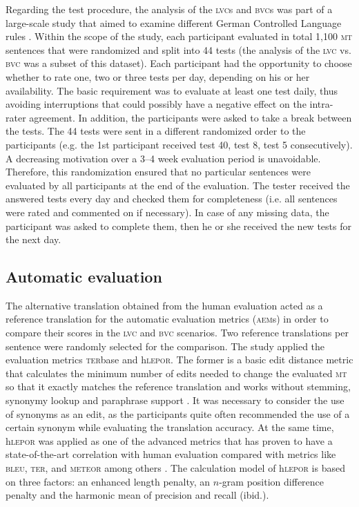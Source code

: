 \documentclass[output=paper]{langsci/langscibook}
\begin{document}
Regarding the test procedure, the analysis of the \textsc{lvc}s and \textsc{bvc}s was part of a large-scale study that aimed to examine different German Controlled Language rules \citep{Marzouk2019}. Within the scope of the study, each participant evaluated in total 1,100 \textsc{mt} sentences that were randomized and split into 44 tests (the analysis of the \textsc{lvc} vs. \textsc{bvc} was a subset of this dataset). Each participant had the opportunity to choose whether to rate one, two or three tests per day, depending on his or her availability. The basic requirement was to evaluate at least one test daily, thus avoiding interruptions that could possibly have a negative effect on the intra-rater agreement. In addition, the participants were asked to take a break between the tests. The 44 tests were sent in a different randomized order to the participants (e.g. the 1st participant received test 40, test 8, test 5 consecutively). A decreasing motivation over a 3--4 week evaluation period is unavoidable. Therefore, this randomization ensured that no particular sentences were evaluated by all participants at the end of the evaluation. The tester received the answered tests every day and checked them for completeness (i.e. all sentences were rated and commented on if necessary). In case of any missing data, the participant was asked to complete them, then he or she received the new tests for the next day.

\subsection{Automatic evaluation}\largerpage


The alternative translation obtained from the human evaluation acted as a reference translation for the automatic evaluation metrics (\textsc{aem}s) in order to compare their scores in the \textsc{lvc} and \textsc{bvc} scenarios. Two reference translations per sentence were randomly selected for the comparison. The study applied the evaluation metrics \textsc{ter}base and h\textsc{lepor}. The former is a basic edit distance metric that calculates the minimum number of edits needed to change the evaluated \textsc{mt} so that it exactly matches the reference translation and works without stemming, synonymy lookup and paraphrase support \citep{Snover2006,Gonzalez2014}. It was necessary to consider the use of synonyms as an edit, as the participants quite often recommended the use of a certain synonym while evaluating the translation accuracy. At the same time, h\textsc{lepor} was applied as one of the advanced metrics that has proven to have a state-of-the-art correlation with human evaluation compared with metrics like \textsc{bleu}, \textsc{ter}, and \textsc{meteor} among others \citep{Han2013}. The calculation model of h\textsc{lepor} is based on three factors: an enhanced length penalty, an $n$-gram position difference penalty and the harmonic mean of precision and recall (ibid.).
\end{document}
